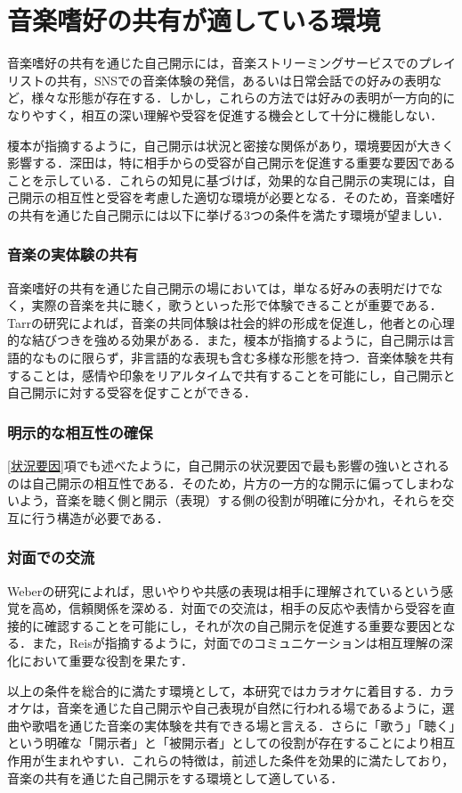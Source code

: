 \section{音楽嗜好の共有が適している環境}\label{音楽嗜好の共有が適している環境}
音楽嗜好の共有を通じた自己開示には，音楽ストリーミングサービスでのプレイリストの共有，SNSでの音楽体験の発信，あるいは日常会話での好みの表明など，様々な形態が存在する．しかし，これらの方法では好みの表明が一方向的になりやすく，相互の深い理解や受容を促進する機会として十分に機能しない．

榎本が指摘するように，自己開示は状況と密接な関係があり，環境要因が大きく影響する．深田は，特に相手からの受容が自己開示を促進する重要な要因であることを示している．これらの知見に基づけば，効果的な自己開示の実現には，自己開示の相互性と受容を考慮した適切な環境が必要となる．そのため，音楽嗜好の共有を通じた自己開示には以下に挙げる3つの条件を満たす環境が望ましい．


\subsubsection{音楽の実体験の共有}
音楽嗜好の共有を通じた自己開示の場においては，単なる好みの表明だけでなく，実際の音楽を共に聴く，歌うといった形で体験できることが重要である．Tarrの研究によれば，音楽の共同体験は社会的絆の形成を促進し，他者との心理的な結びつきを強める効果がある．また，榎本が指摘するように，自己開示は言語的なものに限らず，非言語的な表現も含む多様な形態を持つ．音楽体験を共有することは，感情や印象をリアルタイムで共有することを可能にし，自己開示と自己開示に対する受容を促すことができる．


\subsubsection{明示的な相互性の確保}
\ref{状況要因}項でも述べたように，自己開示の状況要因で最も影響の強いとされるのは自己開示の相互性である．そのため，片方の一方的な開示に偏ってしまわないよう，音楽を聴く側と開示（表現）する側の役割が明確に分かれ，それらを交互に行う構造が必要である．


\subsubsection{対面での交流}
Weberの研究によれば，思いやりや共感の表現は相手に理解されているという感覚を高め，信頼関係を深める．対面での交流は，相手の反応や表情から受容を直接的に確認することを可能にし，それが次の自己開示を促進する重要な要因となる．また，Reisが指摘するように，対面でのコミュニケーションは相互理解の深化において重要な役割を果たす．

以上の条件を総合的に満たす環境として，本研究ではカラオケに着目する．カラオケは，音楽を通じた自己開示や自己表現が自然に行われる場\cite{烏賀陽弘道_2005}であるように，選曲や歌唱を通じた音楽の実体験を共有できる場と言える．さらに「歌う」「聴く」という明確な「開示者」と「被開示者」としての役割が存在することにより相互作用が生まれやすい．これらの特徴は，前述した条件を効果的に満たしており，音楽の共有を通じた自己開示をする環境として適している．